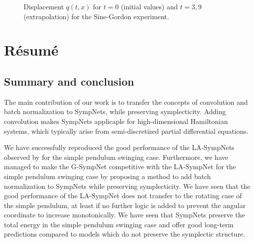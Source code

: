 \documentclass[twoside,a4paper]{article}
\begin{document}
\begin{figure}
	\caption{Displacement $q(t,x)$ for $t=0$ (initial values) and $t=3,9$ (extrapolation) for the
	Sine-Gordon experiment.}\label{fig_sine_gordon_displacement}
\end{figure}

%
%
\clearpage\newpage\null %
\newpage
\section{R\'esum\'e}\label{sec_resume}
\subsection{Summary and conclusion}

The main contribution of our work is to transfer the concepts of
convolution and batch normalization to SympNets, while preserving symplecticity.
Adding convolution makes SympNets applicaple for high-dimensional Hamiltonian systems,
which typically arise from semi-discretized partial differential equations. 

We have successfully reproduced the good performance of the LA-SympNets 
observed by \citeauthor{Jin2020} for the simple pendulum swinging case.
Furthermore, we have managed to
make the G-SympNet competitive with the LA-SympNet for the simple pendulum swinging case
by proposing a method to add batch normalization to SympNets while preserving symplecticity.
We have seen that the good performance of the LA-SympNet does not
transfer to the rotating case of the simple pendulum, at least if no further logic
is added to prevent the angular coordinate to increase monotonically.
We have seen that SympNets preserve the total energy in the simple pendulum swinging case and
offer good long-term predictions compared to models which do not preserve the symplectic
structure.
\end{document}
